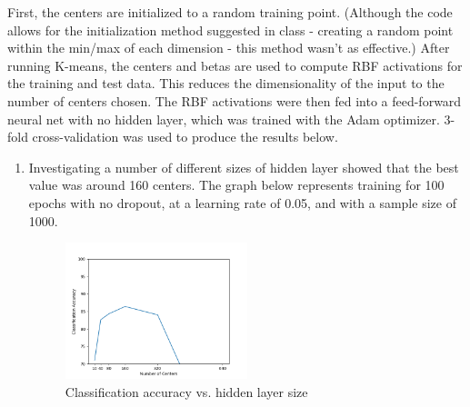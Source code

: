 \documentclass[11pt]{article}
\begin{document}
\begin{enumerate}
First, the centers are initialized to a random training point. (Although the code allows for the initialization method suggested in class - creating a random point within the min/max of each dimension - this method wasn't as effective.) After running K-means, the centers and betas are used to compute RBF activations for the training and test data. This reduces the dimensionality of the input to the number of centers chosen. The RBF activations were then fed into a feed-forward neural net with no hidden layer, which was trained with the Adam optimizer. 3-fold cross-validation was used to produce the results below.
\begin{enumerate}
\item
Investigating a number of different sizes of hidden layer showed that the best value was around 160 centers. The graph below represents training for 100 epochs with no dropout, at a learning rate of 0.05, and with a sample size of 1000.
\begin{figure}[h!]
    \centering
     \includegraphics[width=0.5\textwidth]{q2_centers}
        \caption{Classification accuracy vs. hidden layer size}
\end{figure}


\end{enumerate}
\end{enumerate}
\end{document}

